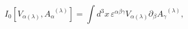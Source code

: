 \begin{equation}
I_{0}\left[ V_{\alpha (\lambda )},A_{\alpha }^{\;\;(\lambda )}\right] =\int
d^{3}x\,\varepsilon ^{\alpha \beta \gamma }V_{\alpha (\lambda )}\partial
_{\beta }A_{\gamma }^{\;\;(\lambda )},  \label{bf33}
\end{equation}

